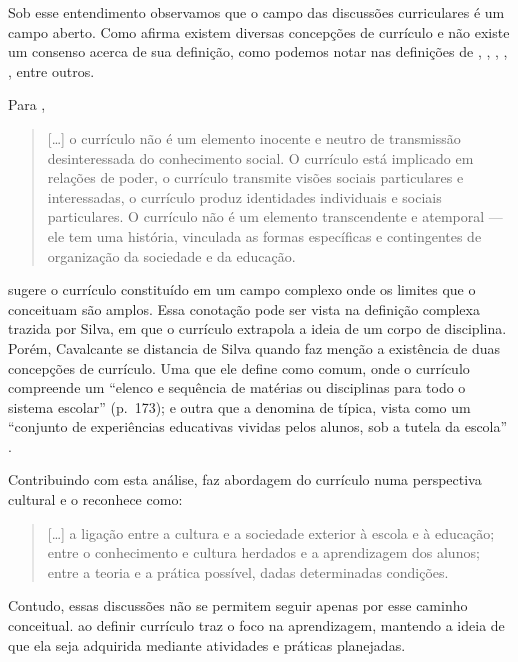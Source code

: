 \begin{refsection}
    Sob esse entendimento observamos que o campo das discussões curriculares é um campo aberto. Como afirma \textcite{PACHECO2007Currículo} existem diversas concepções de currículo e não existe um consenso acerca de sua definição, como podemos notar nas definições de \textcite{MoreiraAndSilva2005Currículo}, \textcite{CAVALCANTI2011Currículo}, \textcite{SACRISTÁN1999Poderes}, \textcite{MASETTO2003Competência}, \textcite{OLIVEIRA2013Novas}, entre outros. 

    Para \textcite[p.~8]{MoreiraAndSilva2005Currículo}, 

    \begin{quotation}
        [\dots] o currículo não é um elemento inocente e neutro de transmissão desinteressada do conhecimento social. O currículo está implicado em relações de poder, o currículo transmite visões sociais particulares e interessadas, o currículo produz identidades individuais e sociais particulares. O currículo não é um elemento transcendente e atemporal --- ele tem uma história, vinculada as formas específicas e contingentes de organização da sociedade e da educação. 
    \end{quotation}

    \textcite{CAVALCANTI2011Currículo} sugere o currículo constituído em um campo complexo onde os limites que o conceituam são amplos. Essa conotação pode ser vista na definição complexa trazida por Silva, em que o currículo extrapola a ideia de um corpo de disciplina. Porém, Cavalcante se distancia de Silva quando faz menção a existência de duas concepções de currículo. Uma que ele define como comum, onde o currículo compreende um “elenco e sequência de matérias ou disciplinas para todo o sistema escolar” (p.~173); e outra que a denomina de típica, vista como um “conjunto de experiências educativas vividas pelos alunos, sob a tutela da escola” \cite[p.~173]{CAVALCANTI2011Currículo}. 

    Contribuindo com esta análise, \textcite[p.~61]{SACRISTÁN1999Poderes} faz abordagem do currículo numa perspectiva cultural e o reconhece como: 

    \begin{quotation}
        [\dots] a ligação entre a cultura e a sociedade exterior à escola e à educação; entre o conhecimento e cultura herdados e a aprendizagem dos alunos; entre a teoria e a prática possível, dadas determinadas condições. 
    \end{quotation}

    Contudo, essas discussões não se permitem seguir apenas por esse caminho conceitual. \textcite{MASETTO2003Competência} ao definir currículo traz o foco na aprendizagem, mantendo a ideia de que ela seja adquirida mediante atividades e práticas planejadas.  


\end{refsection}
